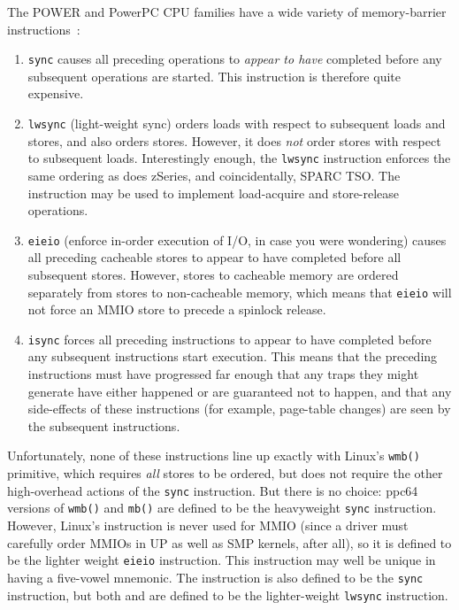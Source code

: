 The POWER and PowerPC\textsuperscript{\textregistered}
CPU families have a wide variety of memory-barrier
instructions~\cite{PowerPC94,MichaelLyons05a}:
\begin{enumerate}
\item	{\tt sync} causes all preceding operations to {\em appear to have}
	completed before any subsequent operations are started.
	This instruction is therefore quite expensive.
\item	{\tt lwsync} (light-weight sync) orders loads with respect to
	subsequent loads and stores, and also orders stores.
	However, it does {\em not} order stores with respect to subsequent
	loads.
	Interestingly enough, the {\tt lwsync} instruction enforces
	the same ordering as does zSeries, and coincidentally,
	SPARC TSO.
	The  instruction may be used to implement
	load-acquire and store-release operations.
\item	{\tt eieio} (enforce in-order execution of I/O, in case you
	were wondering) causes all preceding cacheable stores to appear
	to have completed before all subsequent stores.
	However, stores to cacheable memory are ordered separately from
	stores to non-cacheable memory, which means that {\tt eieio}
	will not force an MMIO store to precede a spinlock release.
\item	{\tt isync} forces all preceding instructions to appear to have
	completed before any subsequent instructions start execution.
	This means that the preceding instructions must have progressed
	far enough that any traps they might generate have either happened
	or are guaranteed not to happen, and that any side-effects of
	these instructions (for example, page-table changes) are seen by the
	subsequent instructions.
\end{enumerate}

Unfortunately, none of these instructions line up exactly with Linux's
{\tt wmb()} primitive, which requires {\em all} stores to be ordered,
but does not require the other high-overhead actions of the {\tt sync}
instruction.
But there is no choice: ppc64 versions of {\tt wmb()} and {\tt mb()} are
defined to be the heavyweight {\tt sync} instruction.
However, Linux's  instruction is never used for MMIO
(since a driver must carefully order MMIOs in UP as well as
SMP kernels, after all), so it is defined to be the lighter weight
{\tt eieio} instruction.
This instruction may well be unique in having a five-vowel mnemonic.
The  instruction is also defined to be the {\tt sync}
instruction, but both  and  are defined to
be the lighter-weight {\tt lwsync} instruction.

